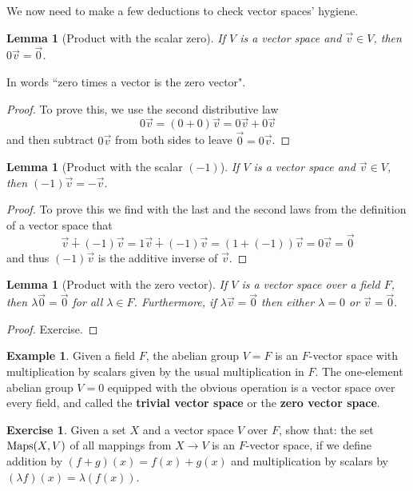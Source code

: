 \documentclass[11pt]{amsbook}
\newtheorem{lemma}[theorem]{Lemma}
\theoremstyle{definition}
\newtheorem{ex}[theorem]{Example}
\newtheorem{exercise}{Exercise}
\begin{document}
We now need to make a few deductions to check vector spaces' hygiene.

\begin{lemma}[Product with the scalar zero] \label{zerovs} If $V$ is a vector space and $\vec{v} \in V$, then $0\vec{v} = \vec{0}$.
\end{lemma}
In words ``zero times a vector is the zero vector".
\begin{proof}To prove this, we use the second distributive law $$0 \vec{v} = (0 + 0)\vec{v} = 0\vec{v} + 0\vec{v}$$ and then subtract $0\vec{v}$ from both sides to leave $\vec{0} = 0\vec{v}$.
\end{proof}

\begin{lemma}[Product with the scalar $(-1)$]  \label{-1vs} If $V$ is a vector space and $\vec{v}\in V$, then $(-1) \vec{v} = -\vec{v}.$
\end{lemma}
\begin{proof} To prove this we find with the last and the second laws from the definition of a vector space that $$\vec{v} \dotplus (-1)\vec{v} = 1\vec{v} \dotplus (-1)\vec{v} = (1 + (-1))\vec{v} = 0 \vec{v} = \vec{0}$$ and thus $(-1)\vec{v}$ is the additive inverse of $\vec{v}$.
\end{proof}

\begin{lemma}[Product with the zero vector] \label{prodzero} If $V$ is a vector space over a field $F$, then  $\lambda \vec{0} = \vec{0}$ for all $\lambda \in F$. Furthermore, if $\lambda \vec{v} = \vec{0}$ then either $\lambda = 0$ or $\vec{v} = \vec{0}.$
\end{lemma}
\begin{proof}
Exercise.
\end{proof}

\begin{ex} \label{zerovs1} Given a field $F$, the abelian group $V = F$ is an $F$-vector space with multiplication by scalars given by the usual multiplication in $F$. The one-element abelian group $V = 0$ equipped with the obvious operation is a vector space over every field, and called the {\bf trivial vector space} or the {\bf zero vector space}.
\end{ex}

\begin{exercise} \label{matvs}Given a set $X$ and a vector space $V$ over $F$, show that: the set ${\rm Maps}(X,V)$ of all mappings from $X \to V$ is an $F$-vector space, if we define addition by $(f+g)(x) = f(x) + g(x)$ and multiplication by scalars by $(\lambda f)(x) = \lambda (f(x))$.
\end{exercise}
\end{document}
